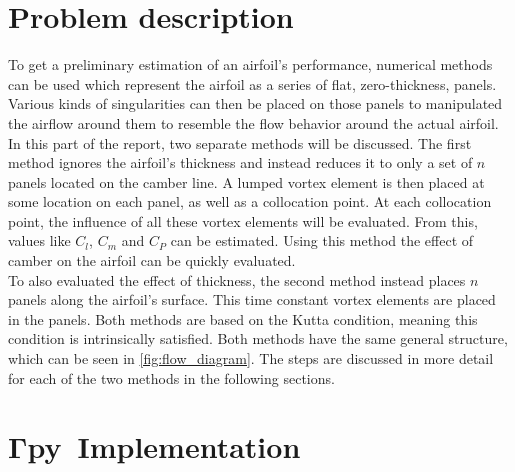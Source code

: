 \newcommand{\numfoil}{$\boldsymbol{\Gamma}$\textbf{py}\ }
\chapter{Problem description}
To get a preliminary estimation of an airfoil's performance, numerical methods
can be used which represent the airfoil as a series of flat, zero-thickness,
panels. Various kinds of singularities can then be placed on those panels to
manipulated the airflow around them to resemble the flow behavior around the
actual airfoil.\\

In this part of the report, two separate methods will be discussed.
The first method ignores the airfoil's thickness and instead reduces it to only
a set of $n$ panels located on the camber line. A lumped vortex element is then
placed at some location on each panel, as well as a collocation point. At each
collocation point, the influence of all these vortex elements will be evaluated.
From this, values like $C_l$, $C_m$ and $C_P$ can be estimated. Using this
method the effect of camber on the airfoil can be quickly evaluated.\\

To also evaluated the effect of thickness, the second method instead places $n$
panels along the airfoil's surface. This time constant vortex elements are
placed in the panels.
Both methods are based on the Kutta condition, meaning this condition is
intrinsically satisfied. Both methods have the same general structure, which can
be seen in \autoref{fig:flow_diagram}. The steps are discussed in more detail
for each of the two methods in the following sections.


\chapter{\numfoil Implementation}

\blindtext

